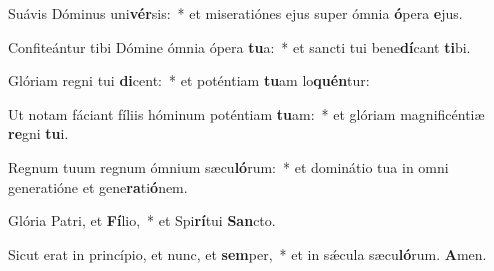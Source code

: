 \item Suávis Dóminus uni\textbf{vér}sis:~* et miseratiónes ejus super ómnia \textbf{ó}pera \textbf{e}jus.
\item Confiteántur tibi Dómine ómnia ópera \textbf{tu}a:~* et sancti tui bene\textbf{dí}cant \textbf{ti}bi.
\item Glóriam regni tui \textbf{di}cent:~* et poténtiam \textbf{tu}am lo\textbf{quén}tur:
\item Ut notam fáciant fíliis hóminum poténtiam \textbf{tu}am:~* et glóriam magnificéntiæ \textbf{re}gni \textbf{tu}i.
\item Regnum tuum regnum ó\-mnium sæcu\textbf{ló}rum:~* et dominátio tua in omni generatióne et gene\textbf{ra}ti\textbf{ó}nem.
\item Glória Patri, et \textbf{Fí}lio,~* et Spi\textbf{rí}tui \textbf{San}cto.
\item Sicut erat in princípio, et nunc, et \textbf{sem}per,~* et in sǽcula sæcu\textbf{ló}rum. \textbf{A}men.